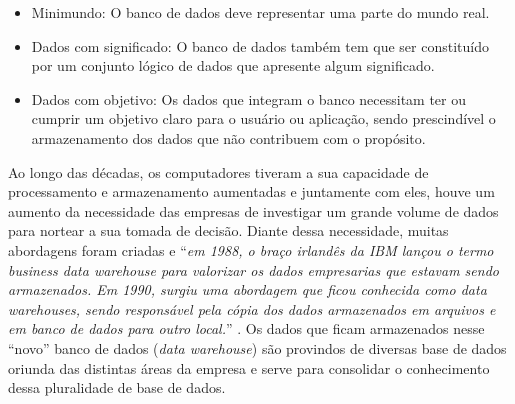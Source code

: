 \begin{itemize}
  \item Minimundo: O banco de dados deve representar uma parte do mundo real.
  \item Dados com significado: O banco de dados também tem que ser constituído por um conjunto lógico de dados que apresente algum significado.
  \item Dados com objetivo: Os dados que integram o banco necessitam ter ou cumprir um objetivo claro para o usuário ou aplicação, sendo prescindível o armazenamento dos dados que não contribuem com o propósito. \cite{vida2021datawarehouse}
\end{itemize} 


\hfill

Ao longo das décadas, os computadores tiveram a sua capacidade de processamento e armazenamento aumentadas e juntamente com eles, houve um aumento da necessidade das empresas de investigar um grande volume de dados para nortear a sua tomada de decisão. Diante dessa necessidade, muitas abordagens foram criadas e \enquote{\textit{em 1988, o braço irlandês da IBM lançou o termo business data warehouse para valorizar os dados empresarias que estavam sendo armazenados. Em 1990, surgiu uma abordagem que ficou conhecida como data warehouses, sendo responsável pela cópia dos dados armazenados em arquivos e em banco de dados para outro local.}} \cite{vida2021datawarehouse}. Os dados que ficam armazenados nesse \enquote{novo} banco de dados (\textit{data warehouse}) são provindos de diversas base de dados oriunda das distintas áreas da empresa e serve para consolidar o conhecimento dessa pluralidade de base de dados.